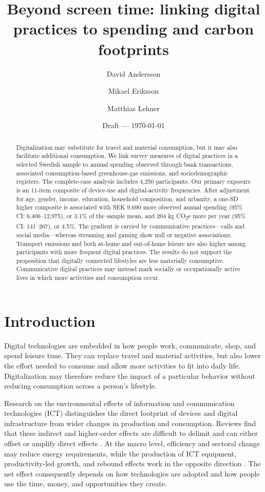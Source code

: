 \documentclass[11pt,a4paper]{article}
\title{Beyond screen time: linking digital practices to spending and carbon footprints}
\author{David Andersson \and Mikael Eriksson \and Matthias Lehner}
\date{Draft --- \today}
\begin{document}
\maketitle

\begin{abstract}
\begin{sloppypar}
Digitalization may substitute for travel and material consumption, but it may
also facilitate additional consumption. We link survey measures of digital
practices in a selected Swedish sample to annual spending observed through bank
transactions, associated consumption-based greenhouse-gas emissions, and
sociodemographic registers. The complete-case analysis includes 4,250
participants. Our primary exposure is an 11-item composite of device-use and
digital-activity frequencies. After adjustment for age, gender, income,
education, household composition, and urbanity, a one-SD higher
composite is associated with SEK 9,690 more observed annual spending (95\% CI:
6,406--12,975), or 3.1\% of the sample mean, and 204 kg CO\textsubscript{2}e
more per year (95\% CI: 141--267), or 4.5\%. The gradient is carried by
communicative practices---calls and social media---whereas streaming and gaming
show null or negative associations. Transport emissions and both at-home and
out-of-home leisure are also higher among participants with more frequent
digital practices. The results do not support the proposition that digitally
connected lifestyles are less materially consumptive. Communicative digital
practices may instead mark socially or occupationally active lives in which
more activities and consumption occur.
\end{sloppypar}
\end{abstract}


\onehalfspacing

\section{Introduction}

Digital technologies are embedded in how people work, communicate, shop, and
spend leisure time. They can replace travel and material activities, but also
lower the effort needed to consume and allow more activities to fit into daily
life. Digitalization may therefore reduce the impact of a particular behavior
without reducing consumption across a person's lifestyle.

Research on the environmental effects of information and communication
technologies (ICT) distinguishes the direct footprint of devices and digital
infrastructure from wider changes in production and consumption. Reviews find
that these indirect and higher-order effects are difficult to delimit and can
either offset or amplify direct effects \citep{horner2016,bieser2018,
pohl2019}. At the macro level, efficiency and sectoral change may reduce energy
requirements, while the production of ICT equipment, productivity-led growth,
and rebound effects work in the opposite direction \citep{lange2020}. The net
effect consequently depends on how technologies are adopted and how people use
the time, money, and opportunities they create.
\end{document}
